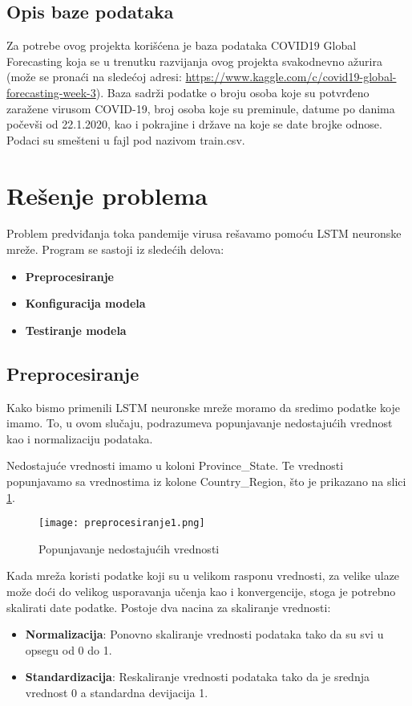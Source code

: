 \documentclass[a4paper]{article}
\begin{document}
\subsection{Opis baze podataka}
Za potrebe ovog projekta korišćena je baza podataka COVID19 Global Forecasting koja se u trenutku razvijanja ovog projekta svakodnevno ažurira (može se pronaći na sledećoj adresi: \url{https://www.kaggle.com/c/covid19-global-forecasting-week-3}). Baza sadrži podatke o broju osoba koje su potvrđeno zaražene virusom COVID-19, broj osoba koje su preminule, datume po danima počevši od 22.1.2020, kao i pokrajine i države na koje se date brojke odnose. Podaci su smešteni u fajl pod nazivom train.csv. 

\section{Rešenje problema}
Problem predviđanja toka pandemije virusa rešavamo pomoću LSTM neuronske mreže. Program se sastoji iz sledećih delova:
\begin{itemize}
    \item \textbf{Preprocesiranje}
    \item \textbf{Konfiguracija modela}
    \item \textbf{Testiranje modela}
\end{itemize}


\subsection{Preprocesiranje}
Kako bismo primenili LSTM neuronske mreže moramo da sredimo podatke koje imamo. To, u ovom slučaju, podrazumeva popunjavanje nedostajućih vrednost kao i normalizaciju podataka.


Nedostajuće vrednosti imamo u koloni Province\_State. Te vrednosti popunjavamo sa vrednostima iz kolone Country\_Region, što je prikazano na slici \ref{fig:Pretprocesiranje1}.  
\begin{figure}[htp]
    \centering
    \texttt{[image: preprocesiranje1.png]}
    \caption{Popunjavanje nedostajućih vrednosti}
    \label{fig:Pretprocesiranje1}
\end{figure}

Kada mreža koristi podatke koji su u velikom rasponu vrednosti, za velike ulaze može doći do velikog usporavanja učenja kao i konvergencije, stoga je potrebno skalirati date podatke. Postoje dva nacina za skaliranje vrednosti:

\begin{itemize}
    \item \textbf{Normalizacija}: Ponovno skaliranje vrednosti podataka tako da su svi u opsegu od 0 do 1.
    \item \textbf{Standardizacija}: Reskaliranje vrednosti podataka tako da je srednja vrednost 0 a standardna devijacija 1.
\end{itemize}
\end{document}
